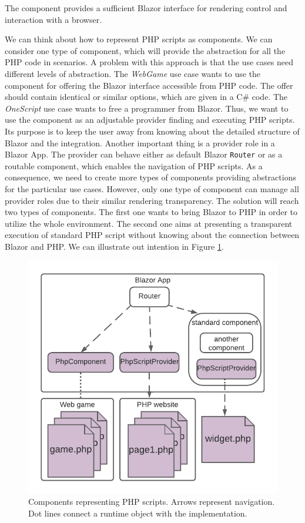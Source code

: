 The component provides a sufficient Blazor interface for rendering control and interaction with a browser. 
\par
We can think about how to represent PHP scripts as components.
We can consider one type of component, which will provide the abstraction for all the PHP code in scenarios.
A problem with this approach is that the use cases need different levels of abstraction.
The \textit{WebGame} use case wants to use the component for offering the Blazor interface accessible from PHP code.
The offer should contain identical or similar options, which are given in a C\# code.
The \textit{OneScript} use case wants to free a programmer from Blazor.
Thus, we want to use the component as an adjustable provider finding and executing PHP scripts.
Its purpose is to keep the user away from knowing about the detailed structure of Blazor and the integration.
Another important thing is a provider role in a Blazor App.
The provider can behave either as default Blazor \texttt{Router} or as a routable component, which enables the navigation of PHP scripts.
As a consequence, we need to create more types of components providing abstractions for the particular use cases.
However, only one type of component can manage all provider roles due to their similar rendering transparency.
The solution will reach two types of components.
The first one wants to bring Blazor to PHP in order to utilize the whole environment.
The second one aims at presenting a transparent execution of standard PHP script without knowing about the connection between Blazor and PHP.
We can illustrate out intention in Figure \ref{img12:component}.
\par
\begin{figure}[!b]\centering
\includegraphics[scale=0.9]{./img/Components}
\caption{Components representing PHP scripts. Arrows represent navigation. 
Dot lines connect a runtime object with the implementation.
}
\label{img12:component}
\end{figure} 
